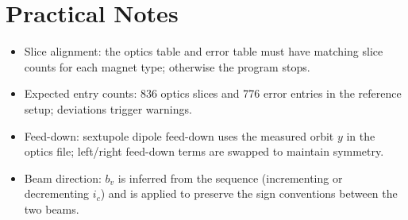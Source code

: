 \documentclass[11pt]{article}
\begin{document}
\section{Practical Notes}
\begin{itemize}
  \item Slice alignment: the optics table and error table must have matching slice counts for each magnet type; otherwise the program stops.
  \item Expected entry counts: 836 optics slices and 776 error entries in the reference setup; deviations trigger warnings.
  \item Feed-down: sextupole dipole feed-down uses the measured orbit $y$ in the optics file; left/right feed-down terms are swapped to maintain symmetry.
  \item Beam direction: $b_v$ is inferred from the sequence (incrementing or decrementing $i_c$) and is applied to preserve the sign conventions between the two beams.
\end{itemize}
\end{document}
